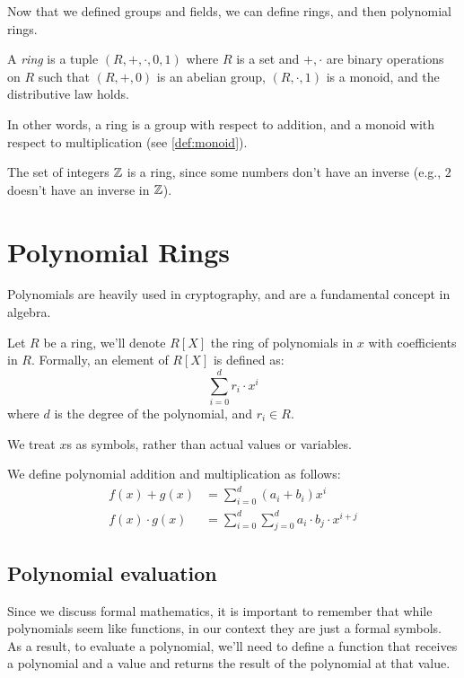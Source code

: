 Now that we defined groups and fields, we can define rings, and then polynomial rings.
\begin{definition}
    A \emph{ring} is a tuple $(R,+,\cdot,0,1)$ where $R$ is a set and $+,\cdot$ are binary operations on $R$
    such that $(R,+,0)$ is an abelian group, $(R,\cdot,1)$ is a monoid, and the distributive law holds.
\end{definition}

In other words, a ring is a group with respect to addition, and a monoid with respect to multiplication (see \autoref{def:monoid}).

\begin{example}
    The set of integers $\mathbb{Z}$ is a ring, since some numbers don't 
    have an inverse (e.g., $2$ doesn't have an inverse in $\mathbb{Z}$). 
\end{example}


\section{Polynomial Rings}

Polynomials are heavily used in cryptography, and are a fundamental concept in algebra.
\begin{definition}
    Let $R$ be a ring, we'll denote $R[X]$ the ring of polynomials
    in $x$ with coefficients in $R$. Formally, an element of $R[X]$ is 
    defined as: $$ \sum_{i=0}^{d} r_i\cdot x^i $$
    where $d$ is the degree of the polynomial, and $r_i\in R$.

    We treat $x$s as symbols, rather than actual values or variables.

    We define polynomial addition and multiplication as follows:
    \begin{align*}
        f(x) + g(x) &= \sum_{i=0}^{d}{(a_i+b_i)x^i} \\
        f(x) \cdot g(x) &= \sum_{i=0}^{d}{\sum_{j=0}^{d}{a_i\cdot b_j\cdot x^{i+j}}}
    \end{align*}
\end{definition} \label{def:polynomial-ring}\label{def:polynomial}

\subsection{Polynomial evaluation}\label{sec:poly-eval}
Since we discuss formal mathematics, it is important to remember 
that while polynomials seem like functions, in our context they are just a formal
symbols.
As a result, to evaluate a polynomial, we'll need to define a function that receives a polynomial 
and a value and returns the result of the polynomial at that value.

